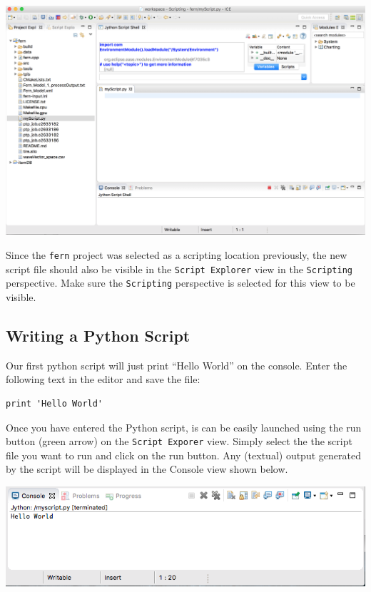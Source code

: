 \begin{center} \includegraphics[width=\textwidth]{images/editor}
\end{center}

Since the \texttt{fern} project was selected as a scripting location
previously, the new script file should also be visible in the \texttt{Script
Explorer} view in the \texttt{Scripting} perspective. Make sure the
\texttt{Scripting} perspective is selected for this view to be visible.

\subsection{Writing a Python Script}

Our first python script will just print ``Hello World'' on the console. Enter
the following text in the editor and save the file:

\begin{verbatim}
print 'Hello World'
\end{verbatim}

Once you have entered the Python script, is can be easily launched using the run
button (green arrow) on the \texttt{Script Exporer} view. Simply select the
the script file you want to run and click on the run button. Any (textual)
output generated by the script will be displayed in the Console view shown
below.

\begin{center} \includegraphics[width=\textwidth]{images/console}
\end{center}

